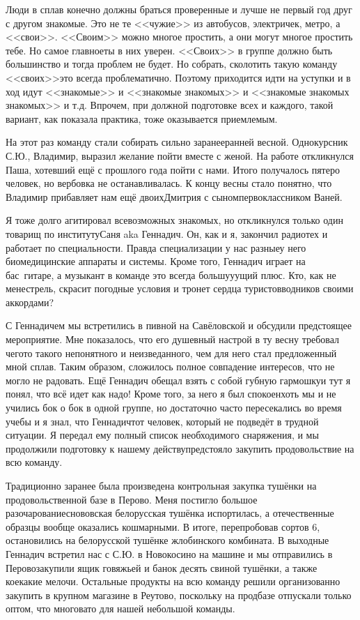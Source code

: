 Люди в сплав конечно должны браться проверенные и лучше не первый год друг с другом знакомые. Это не те <<чужие>> из автобусов, электричек, метро, а <<свои>>. <<Своим>> можно многое простить, а они могут многое простить тебе. Но самое главное\mdash ты в них уверен. <<Своих>> в группе должно быть большинство и тогда проблем не будет. Но собрать, сколотить такую команду <<своих>>\mdash это всегда проблематично. Поэтому приходится идти на уступки и в ход идут <<знакомые>> и <<знакомые знакомых>> и <<знакомые знакомых знакомых>> и т.д. Впрочем, при должной подготовке всех и каждого, такой вариант, как показала практика, тоже оказывается приемлемым.

На этот раз команду стали собирать сильно заранее\mdash ранней весной. Однокурсник С.Ю., Владимир, выразил желание пойти вместе с женой. На работе откликнулся Паша, хотевший ещё с прошлого года пойти с нами. Итого получалось пятеро человек, но вербовка не останавливалась. К концу весны стало понятно, что Владимир прибавляет нам ещё двоих\mdash Дмитрия с сыном\sdash первоклассником Ваней. 

Я тоже долго агитировал всевозможных знакомых, но откликнулся только один товарищ по институту\mdash Саня aka Геннадич. Он, как и я, закончил радиотех и работает по специальности. Правда специализации у нас разные\mdash у него биомедицинские аппараты и системы. Кроме того, Геннадич играет на бас\sdash~гитаре, а музыкант в команде это всегда большу\sdash у\sdash ущий плюс. Кто, как не менестрель, скрасит погодные условия и тронет сердца туристов\sdash водников своими аккордами?

С Геннадичем мы встретились в пивной на Савёловской и обсудили предстоящее мероприятие. Мне показалось, что его душевный настрой в ту весну требовал чего\sdash то такого непонятного и неизведанного, чем для него стал предложенный мной сплав. Таким образом, сложилось полное совпадение интересов, что не могло не радовать. Ещё Геннадич обещал взять с собой губную гармошку\mdash и тут я понял, что всё идет как надо! Кроме того, за него я был спокоен\mdash хоть мы и не учились бок о бок в одной группе, но достаточно часто пересекались во время учебы и я знал, что Геннадич\mdash тот человек, который не подведёт в трудной ситуации. Я передал ему полный список необходимого снаряжения, и мы продолжили подготовку к нашему действу\mdash предстояло закупить продовольствие на всю команду.

Традиционно заранее была произведена контрольная закупка тушёнки на продовольственной базе в Перово. Меня постигло большое разочарование\mdash снововская белорусская тушёнка испортилась, а отечественные образцы вообще оказались кошмарными. В итоге, перепробовав сортов 6, остановились на белорусской тушёнке жлобинского комбината. В выходные Геннадич встретил нас с С.Ю. в Новокосино на машине и мы отправились в Перово\mdash закупили ящик говяжьей и банок десять свиной тушёнки, а также кое\sdash какие мелочи. Остальные продукты на всю команду решили организованно закупить в крупном магазине в Реутово, поскольку на продбазе отпускали только оптом, что многовато для нашей небольшой команды.  

